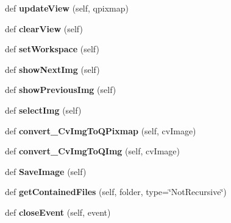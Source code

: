 \begin{DoxyCompactItemize}
\item 
def {\bfseries update\+View} (self, qpixmap)\hypertarget{classEnchain_1_1MainWindow_a5f45d47c0a2c4d499990b218b30d1b79}{}\label{classEnchain_1_1MainWindow_a5f45d47c0a2c4d499990b218b30d1b79}

\item 
def {\bfseries clear\+View} (self)\hypertarget{classEnchain_1_1MainWindow_af8199aed66ca8aa96782ec4f84f6b085}{}\label{classEnchain_1_1MainWindow_af8199aed66ca8aa96782ec4f84f6b085}

\item 
def {\bfseries set\+Workspace} (self)\hypertarget{classEnchain_1_1MainWindow_aebc0385b704f35219927843ad2a05f44}{}\label{classEnchain_1_1MainWindow_aebc0385b704f35219927843ad2a05f44}

\item 
def {\bfseries show\+Next\+Img} (self)\hypertarget{classEnchain_1_1MainWindow_a16cea5f6dfc627ad80861f3f65d726f0}{}\label{classEnchain_1_1MainWindow_a16cea5f6dfc627ad80861f3f65d726f0}

\item 
def {\bfseries show\+Previous\+Img} (self)\hypertarget{classEnchain_1_1MainWindow_a333cbdd2c65818a4073dfe06ee205db6}{}\label{classEnchain_1_1MainWindow_a333cbdd2c65818a4073dfe06ee205db6}

\item 
def {\bfseries select\+Img} (self)\hypertarget{classEnchain_1_1MainWindow_a354c93ca25f09c29c858aad2dfebaab8}{}\label{classEnchain_1_1MainWindow_a354c93ca25f09c29c858aad2dfebaab8}

\item 
def {\bfseries convert\+\_\+\+Cv\+Img\+To\+Q\+Pixmap} (self, cv\+Image)\hypertarget{classEnchain_1_1MainWindow_a86e559ec504749fb5e432fe90c064290}{}\label{classEnchain_1_1MainWindow_a86e559ec504749fb5e432fe90c064290}

\item 
def {\bfseries convert\+\_\+\+Cv\+Img\+To\+Q\+Img} (self, cv\+Image)\hypertarget{classEnchain_1_1MainWindow_a089138200e6bf164896bf2db443f7262}{}\label{classEnchain_1_1MainWindow_a089138200e6bf164896bf2db443f7262}

\item 
def {\bfseries Save\+Image} (self)\hypertarget{classEnchain_1_1MainWindow_a3e0b16b3227213e2f2ee7429681f0ee5}{}\label{classEnchain_1_1MainWindow_a3e0b16b3227213e2f2ee7429681f0ee5}

\item 
def {\bfseries get\+Contained\+Files} (self, folder, type=\char`\"{}Not\+Recursive\char`\"{})\hypertarget{classEnchain_1_1MainWindow_a12fc7938fcf2c0f15a9cf5eb2d4a8636}{}\label{classEnchain_1_1MainWindow_a12fc7938fcf2c0f15a9cf5eb2d4a8636}

\item 
def {\bfseries close\+Event} (self, event)\hypertarget{classEnchain_1_1MainWindow_a1d863ca1f6dd23b2e013634d9aaa1f7b}{}\label{classEnchain_1_1MainWindow_a1d863ca1f6dd23b2e013634d9aaa1f7b}

\end{DoxyCompactItemize}
